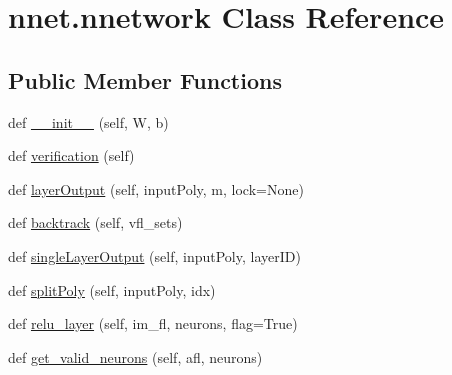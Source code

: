 \hypertarget{classnnet_1_1nnetwork}{}\section{nnet.\+nnetwork Class Reference}
\label{classnnet_1_1nnetwork}
\subsection*{Public Member Functions}
\begin{DoxyCompactItemize}
\item 
def \hyperlink{classnnet_1_1nnetwork_ae3c3989cf684b36b9487b5127f09f35c}{\+\_\+\+\_\+init\+\_\+\+\_\+} (self, W, b)
\item 
def \hyperlink{classnnet_1_1nnetwork_a228fd032b42053b8c8b3c5d9b6d6bdd0}{verification} (self)
\item 
def \hyperlink{classnnet_1_1nnetwork_a3d6fad4cceab8ce0a40a5d06c58b1a86}{layer\+Output} (self, input\+Poly, m, lock=None)
\item 
def \hyperlink{classnnet_1_1nnetwork_a6298ba244c8288b4be06ca140be7fafa}{backtrack} (self, vfl\+\_\+sets)
\item 
def \hyperlink{classnnet_1_1nnetwork_a27f13ef2943f1c10aa7dd049726949fb}{single\+Layer\+Output} (self, input\+Poly, layer\+ID)
\item 
def \hyperlink{classnnet_1_1nnetwork_a0ffc5a42839ee2eb600c8f8113d3a20a}{split\+Poly} (self, input\+Poly, idx)
\item 
def \hyperlink{classnnet_1_1nnetwork_a29d948dbd33c34bb61d754a98a4422a9}{relu\+\_\+layer} (self, im\+\_\+fl, neurons, flag=True)
\item 
def \hyperlink{classnnet_1_1nnetwork_a764b3d1d0f1c3c164b4c3a9ee9bedeed}{get\+\_\+valid\+\_\+neurons} (self, afl, neurons)
\end{DoxyCompactItemize}
